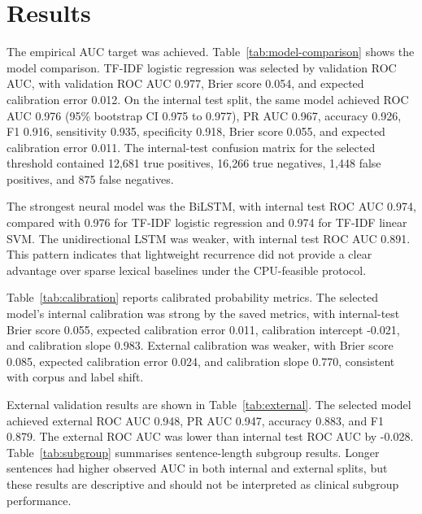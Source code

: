 \section*{Results}
The empirical AUC target was achieved. Table~\ref{tab:model-comparison} shows the model comparison. TF-IDF logistic regression was selected by validation ROC AUC, with validation ROC AUC 0.977, Brier score 0.054, and expected calibration error 0.012. On the internal test split, the same model achieved ROC AUC 0.976 (95\% bootstrap CI 0.975 to 0.977), PR AUC 0.967, accuracy 0.926, F1 0.916, sensitivity 0.935, specificity 0.918, Brier score 0.055, and expected calibration error 0.011. The internal-test confusion matrix for the selected threshold contained 12,681 true positives, 16,266 true negatives, 1,448 false positives, and 875 false negatives.



The strongest neural model was the BiLSTM, with internal test ROC AUC 0.974, compared with 0.976 for TF-IDF logistic regression and 0.974 for TF-IDF linear SVM. The unidirectional LSTM was weaker, with internal test ROC AUC 0.891. This pattern indicates that lightweight recurrence did not provide a clear advantage over sparse lexical baselines under the CPU-feasible protocol.

Table~\ref{tab:calibration} reports calibrated probability metrics. The selected model's internal calibration was strong by the saved metrics, with internal-test Brier score 0.055, expected calibration error 0.011, calibration intercept -0.021, and calibration slope 0.983. External calibration was weaker, with Brier score 0.085, expected calibration error 0.024, and calibration slope 0.770, consistent with corpus and label shift.



External validation results are shown in Table~\ref{tab:external}. The selected model achieved external ROC AUC 0.948, PR AUC 0.947, accuracy 0.883, and F1 0.879. The external ROC AUC was lower than internal test ROC AUC by -0.028. Table~\ref{tab:subgroup} summarises sentence-length subgroup results. Longer sentences had higher observed AUC in both internal and external splits, but these results are descriptive and should not be interpreted as clinical subgroup performance.





